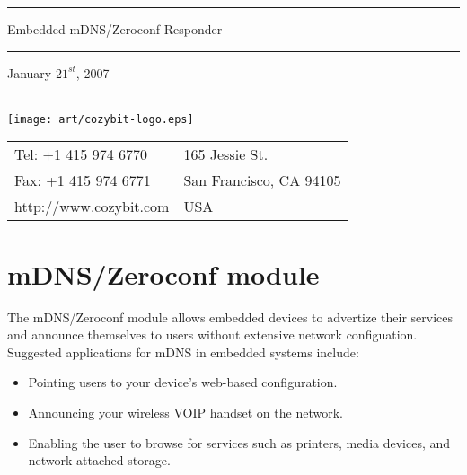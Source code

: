 \documentclass[11pt,titlepage]{article}
\begin{document}
\begin{titlepage}
\lstset{language=c}
\newcommand\HRule{\noindent\rule{\linewidth}{1.5pt}}
\HRule
\begin{center}
	\LARGE Embedded mDNS/Zeroconf Responder
\end{center}
\HRule
{}
\vspace{1in}
\begin{center}
	\Large
{\small January $21^{st}$, 2007}\\
\rule{0pt}{20ex}\\
\texttt{[image: art/cozybit-logo.eps]}\\
\vspace{3ex}
{\scriptsize 
\begin{tabular}{l l}
Tel: +1 415 974 6770 	& 165 Jessie St. \\
Fax: +1 415 974 6771    & San Francisco, CA 94105 \\
http://www.cozybit.com  & USA \\
\end{tabular}}
\end{center}
\end{titlepage}
\clearpage


\section{mDNS/Zeroconf module}

The mDNS/Zeroconf module allows embedded devices to advertize their services 
and announce themselves to users without extensive network configuation. 
Suggested applications for mDNS in embedded systems include:

\begin{itemize}
	\item Pointing users to your device's web-based configuration.
	\item Announcing your wireless VOIP handset on the network.
	\item Enabling the user to browse for services such as printers, media
		  devices, and network-attached storage.
\end{itemize}
\end{document}
